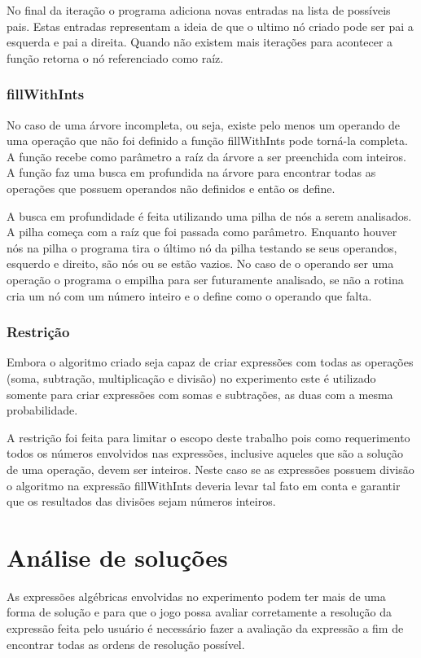 	No final da iteração o programa adiciona novas entradas na lista de possíveis pais. Estas entradas representam a ideia de que o ultimo nó criado pode ser pai a esquerda e pai a direita. Quando não existem mais iterações para acontecer a função retorna o nó referenciado como raíz.
	
\subsubsection{fillWithInts}
No caso de uma árvore incompleta, ou seja, existe pelo menos um operando de uma operação que não foi definido a função fillWithInts pode torná-la completa. A função recebe como parâmetro a raíz da árvore a ser preenchida com inteiros. A função faz uma busca em profundida na árvore para encontrar todas as operações que possuem operandos não definidos e então os define.

	A busca em profundidade é feita utilizando uma pilha de nós a serem analisados. A pilha começa com a raíz que foi passada como parâmetro. Enquanto houver nós na pilha o programa tira o último nó da pilha testando se seus operandos, esquerdo e direito, são nós ou se estão vazios. No caso de o operando ser uma operação o programa o empilha para ser futuramente analisado, se não a rotina cria um nó com um número inteiro e o define como o operando que falta.
	
\subsubsection{Restrição}
Embora o algoritmo criado seja capaz de criar expressões com todas as operações (soma, subtração, multiplicação e divisão) no experimento este é utilizado somente para criar expressões com somas e subtrações, as duas com a mesma probabilidade.

	A restrição foi feita para limitar o escopo deste trabalho pois como requerimento todos os números envolvidos nas expressões, inclusive aqueles que são a solução de uma operação, devem ser inteiros. Neste caso se as expressões possuem divisão o algoritmo na expressão fillWithInts deveria levar tal fato em conta e garantir que os resultados das divisões sejam números inteiros.
	
\section{Análise de soluções}
As expressões algébricas envolvidas no experimento podem ter mais de uma forma de solução e para que o jogo possa avaliar corretamente a resolução da expressão feita pelo usuário é necessário fazer a avaliação da expressão a fim de encontrar todas as ordens de resolução possível.


